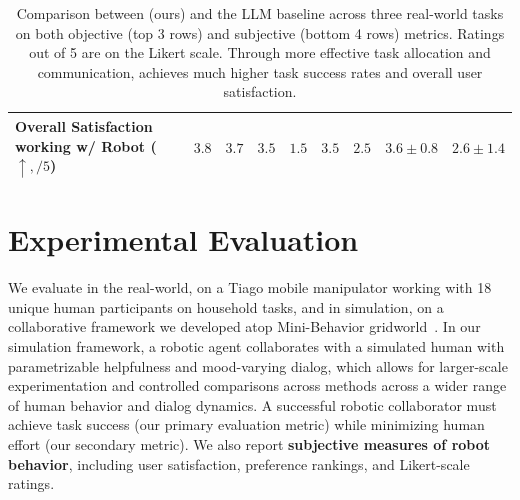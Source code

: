 \begin{table}[t!]
{\begin{tabular}{lcccccccc}
Overall Satisfaction working w/ Robot ($\uparrow, /5$) & $\mathbf{3.8}$ & $3.7$ & $\mathbf{3.5}$ & $1.5$ & $\mathbf{3.5}$ & $2.5$ & $\mathbf{3.6 \pm 0.8}$ & $2.6 \pm 1.4$ \\
\bottomrule
\end{tabular}
}
\caption{
Comparison between \ours{} (ours) and the LLM baseline across three real-world tasks on both objective (top 3 rows) and subjective (bottom 4 rows) metrics. Ratings out of 5 are on the Likert scale. Through more effective task allocation and communication, \ours{} achieves much higher task success rates and overall user satisfaction.}
\label{tab:real-world}
\end{table}


\section{Experimental Evaluation}
\label{sec:exp}
We evaluate \methodname{} in the real-world, on a Tiago mobile manipulator working with 18 unique human participants on household tasks, and in simulation, on a collaborative framework we developed atop Mini-Behavior gridworld~\cite{jin2023minibehavior}. In our simulation framework, a robotic agent collaborates with a simulated human with parametrizable helpfulness and mood-varying dialog, which allows for larger-scale experimentation and controlled comparisons across methods across a wider range of human behavior and dialog dynamics. A successful robotic collaborator must achieve task success (our primary evaluation metric) while minimizing human effort (our secondary metric).
We also report \textbf{subjective measures of robot behavior}, including user satisfaction, preference rankings, and Likert-scale ratings.

